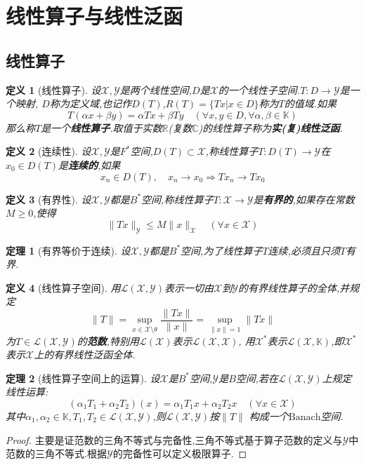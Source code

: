 \documentclass[12pt,a4paper]{article}
\newtheorem{thm}{定理}[subsection]  %
\newtheorem{definition}{定义}[subsection] %
\begin{document}
\newpage

\section{线性算子与线性泛函}

\subsection{线性算子}
\begin{definition}[线性算子]
    设$\mathscr{X},\mathscr{Y}$是两个线性空间,$D$是$\mathscr{X}$的一个线性子空间.$T:D\to \mathscr{Y}$是一个映射,
    $D$称为定义域,也记作$D(T)$,$R(T)=\{Tx|x \in D\}$称为$T$的值域.如果
    \[T(\alpha x + \beta y) = \alpha Tx + \beta Ty\quad (\forall x,y \in D,\forall \alpha,\beta \in \mathbb{K})\]
    那么称$T$是一个\textbf{线性算子}.取值于实数$\mathbb{R}$(复数$\mathbb{C}$)的线性算子称为\textbf{实(复)线性泛函}.
\end{definition}
\begin{definition}[连续性]
    设$\mathscr{X},\mathscr{Y}$是$F^*$空间,$D(T)\subset \mathscr{X}$,称线性算子$T:D(T)\to \mathscr{Y}$在$x_0 \in D(T)$是\textbf{连续的},如果
    \[x_n \in D(T),\quad x_n \to x_0\Rightarrow Tx_n\to Tx_0\]
\end{definition}
\begin{definition}[有界性]
    设$\mathscr{X},\mathscr{Y}$都是$B^*$空间,称线性算子$T:\mathscr{X}\to \mathscr{Y}$是\textbf{有界的},如果存在常数$M\geq 0$,使得
    \[\|Tx\|_{\mathscr{Y}}\leq M\|x\|_{\mathscr{X}} \quad (\forall x \in \mathscr{X})\]
\end{definition}
\begin{thm}[有界等价于连续]
    设$\mathscr{X},\mathscr{Y}$都是$B^*$空间,为了线性算子$T$连续,必须且只须$T$有界.
\end{thm}
\begin{definition}[线性算子空间]
    用$\mathscr{L}(\mathscr{X},\mathscr{Y})$表示一切由$\mathscr{X}$到$\mathscr{Y}$的有界线性算子的全体,并规定
    \[\|T\| = \underset{x\in \mathscr{X}\setminus \theta}{\sup} \frac{\|Tx\|}{\|x\|} = \underset{\|x\|=1}{\sup}\|Tx\| \]
    为$T\in \mathscr{L}(\mathscr{X},\mathscr{Y})$的\textbf{范数},特别用$\mathscr{L}(\mathscr{X})$表示$\mathscr{L}(\mathscr{X},\mathscr{X})$,
    用$\mathscr{X}^*$表示$\mathscr{L}(\mathscr{X},\mathbb{K})$,即$\mathscr{X}^*$表示$\mathscr{X}$上的有界线性泛函全体.
\end{definition}
\begin{thm}[线性算子空间上的运算]
    设$\mathscr{X}$是$B^*$空间,$\mathscr{Y}$是$B$空间,若在$\mathscr{L}(\mathscr{X},\mathscr{Y})$上规定线性运算:
    \[(\alpha_1 T_1 + \alpha_2 T_2)(x) = \alpha_1 T_1 x + \alpha_2 T_2 x \quad (\forall x \in \mathscr{X}) \]
    其中$\alpha_1,\alpha_2\in \mathbb{K},T_1,T_2\in\mathscr{L}(\mathscr{X},\mathscr{Y})$,则$\mathscr{L}(\mathscr{X},\mathscr{Y})$按$\|T\|$
    构成一个$\mathrm{Banach}$空间.
\end{thm}
\begin{proof}
    主要是证范数的三角不等式与完备性,三角不等式基于算子范数的定义与$\mathscr{Y}$中范数的三角不等式.根据$\mathscr{Y}$的完备性可以定义极限算子.
\end{proof}
\end{document}
